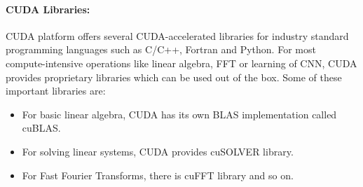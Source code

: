 \documentclass[thesis.tex]{subfiles}
\begin{document}
\paragraph{CUDA Libraries:}CUDA platform offers several CUDA-accelerated libraries for industry standard programming languages such as C/C++, Fortran and Python. For most compute-intensive operations like linear algebra, FFT or learning of CNN, CUDA provides proprietary libraries which can be used out of the box. Some of these important libraries are:
\begin{itemize}
	\item For basic linear algebra, CUDA has its own BLAS implementation called cuBLAS.
	\item For solving linear systems, CUDA provides cuSOLVER library.
	\item For Fast Fourier Transforms, there is cuFFT library and so on.
\end{itemize}




\subfilebib %
\end{document}
